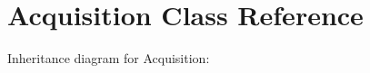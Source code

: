 \hypertarget{classAcquisition}{}\section{Acquisition Class Reference}
\label{classAcquisition}


Inheritance diagram for Acquisition\+:
